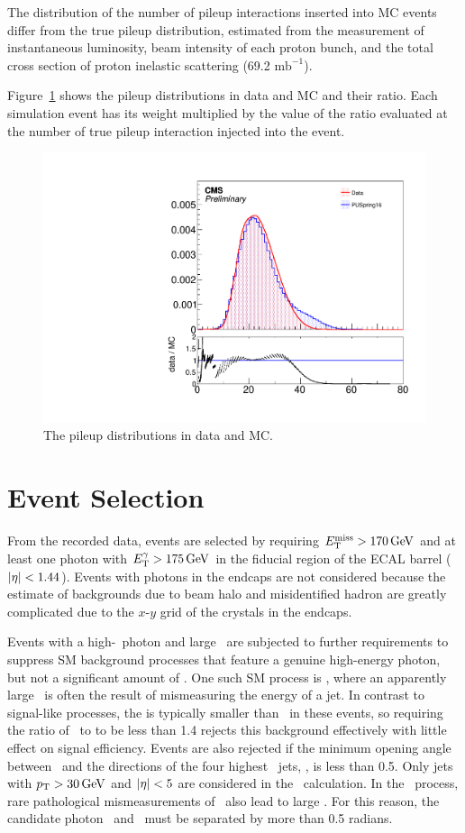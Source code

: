 The distribution of the number of pileup interactions inserted into MC events differ from the true pileup distribution, estimated from the measurement of instantaneous luminosity, beam intensity of each proton bunch, and the total cross section of proton inelastic scattering (69.2 $\textrm{mb}^{-1}$).

Figure~\ref{fig:pudist} shows the pileup distributions in data and MC and their ratio. 
Each simulation event has its weight multiplied by the value of the ratio evaluated at the number of true pileup interaction injected into the event.

\begin{figure}[htbp]
  \centering
  \includegraphics[width=0.48\linewidth]{Calibration/Figures/PUMoriond17.pdf}
  \caption{
    The pileup distributions in data and MC.
  }
  \label{fig:pudist}
\end{figure}

\section{Event Selection}
\label{sec:event_selection}

From the recorded data, events are selected by requiring $E_{\mathrm{T}}^{\text{miss}} > 170\,\text{Ge\hspace{-.08em}V}$ and at least one photon with $E_{\mathrm{T}}^{\gamma} > 175\,\text{Ge\hspace{-.08em}V}$ in the fiducial region of the ECAL barrel ($\lvert \eta \rvert < 1.44$). Events with photons in the endcaps are not considered because the estimate of backgrounds due to beam halo and misidentified hadron are greatly complicated due to the $x$-$y$ grid of the crystals in the endcaps.

Events with a high-\pt\ photon and large \met\ are subjected to further requirements to suppress SM background processes that feature a genuine high-energy photon, but not a significant amount of \met.
One such SM process is \gj, where an apparently large \met\ is often the result of mismeasuring the energy of a jet.
In contrast to signal-like processes, the \met is typically smaller than \ETg\ in these events, so requiring the ratio of \ETg\ to \met to be less than 1.4 rejects this background effectively with little effect on signal efficiency. %
Events are also rejected if the minimum opening angle between \ptvecmiss\ and the directions of the four highest \pt\ jets, \mindphijmet, is less than 0.5. %
Only jets with $p_{\mathrm{T}} > 30\,\text{Ge\hspace{-.08em}V}$ and $\lvert \eta \rvert < 5$ are considered in the \mindphijmet\ calculation.
In the \gj\ process, rare pathological mismeasurements of \ETg\ also lead to large \met. 
For this reason, the candidate photon \ptvec\ and \ptvecmiss\ must be separated by more than 0.5 radians. %

